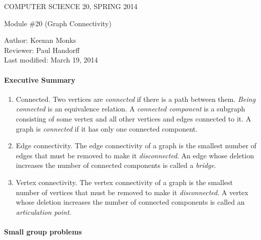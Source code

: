 \documentclass[12pt]{article}
\begin{document}
\begin{center}
COMPUTER SCIENCE 20, SPRING 2014 \\

\smallskip

Module \#20 (Graph Connectivity)
\end{center}
Author: Keenan Monks\\
Reviewer: Paul Handorff\\
Last modified: March 19, 2014

\medskip

\paragraph*{Executive Summary}
\begin{enumerate}

\item Connected. Two vertices are \emph{connected} if there is a path between them. \emph{Being connected} is an equivalence relation. A \emph{connected component} is a subgraph consisting of some vertex and all other vertices and edges connected to it. A graph is \emph{connected} if it has only one connected component. 

\item Edge connectivity. The edge connectivity of a graph is the smallest number of edges that must be removed to make it \emph{disconnected}. An edge whose deletion increases the number of connected components is called a \emph{bridge}.   

\item Vertex connectivity. The vertex connectivity of a graph is the smallest number of vertices that must be removed to make it \emph{disconnected}. A vertex whose deletion increases the number of connected components is called an \emph{articulation point}.
\end{enumerate}

\paragraph*{Small group problems}
\end{document}
